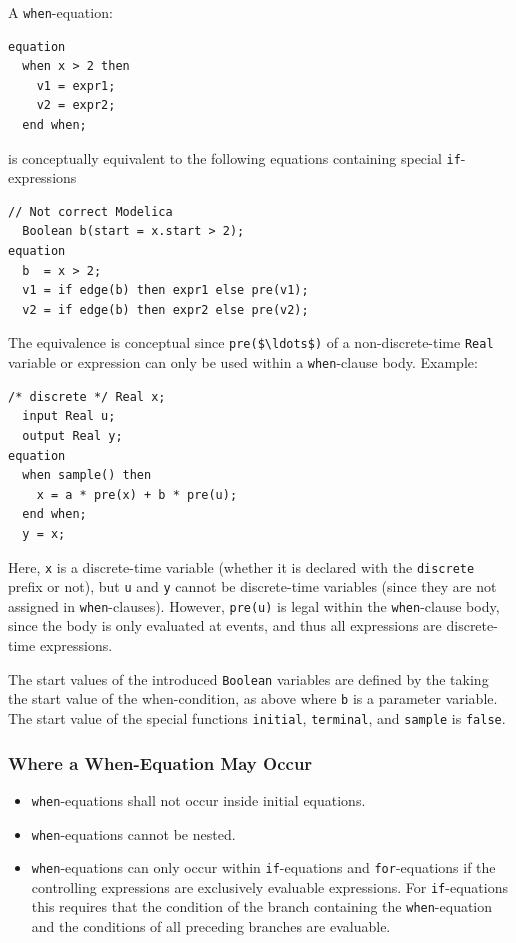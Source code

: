 A \lstinline!when!-equation:
\begin{lstlisting}[language=modelica]
equation
  when x > 2 then
    v1 = expr1;
    v2 = expr2;
  end when;
\end{lstlisting}
is conceptually equivalent to the following equations containing special \lstinline!if!-expressions
\begin{lstlisting}[language=modelica]
  // Not correct Modelica
  Boolean b(start = x.start > 2);
equation
  b  = x > 2;
  v1 = if edge(b) then expr1 else pre(v1);
  v2 = if edge(b) then expr2 else pre(v2);
\end{lstlisting}

\begin{nonnormative}
The equivalence is conceptual since \lstinline!pre($\ldots$)! of a non-discrete-time \lstinline!Real! variable or expression can only be used within a \lstinline!when!-clause body.
Example:
\begin{lstlisting}[language=modelica]
  /* discrete */ Real x;
  input Real u;
  output Real y;
equation
  when sample() then
    x = a * pre(x) + b * pre(u);
  end when;
  y = x;
\end{lstlisting}

Here, \lstinline!x! is a discrete-time variable (whether it is declared with the \lstinline!discrete! prefix or not), but \lstinline!u! and \lstinline!y! cannot be discrete-time variables
(since they are not assigned in \lstinline!when!-clauses).
However, \lstinline!pre(u)! is legal within the \lstinline!when!-clause body, since the body is only evaluated at events, and thus all expressions are discrete-time expressions.
\end{nonnormative}

The start values of the introduced \lstinline!Boolean! variables are defined by the taking the start value of the when-condition, as above where \lstinline!b! is a parameter variable.
The start value of the special functions \lstinline!initial!, \lstinline!terminal!, and \lstinline!sample! is \lstinline!false!.


\subsubsection{Where a When-Equation May Occur}\label{restrictions-on-where-a-when-equation-may-occur}\label{where-a-when-equation-may-occur}

\begin{itemize}
\item
  \lstinline!when!-equations shall not occur inside initial equations.
\item
  \lstinline!when!-equations cannot be nested.
\item
  \lstinline!when!-equations can only occur within \lstinline!if!-equations and \lstinline!for!-equations if the controlling expressions are exclusively evaluable expressions.
  For \lstinline!if!-equations this requires that the condition of the branch containing the \lstinline!when!-equation and the conditions of all preceding branches are evaluable.
\end{itemize}

